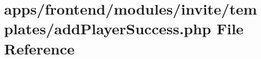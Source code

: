 \hypertarget{invite_2templates_2add_player_success_8php}{\section{apps/frontend/modules/invite/templates/add\-Player\-Success.php File Reference}
\label{invite_2templates_2add_player_success_8php}
}

